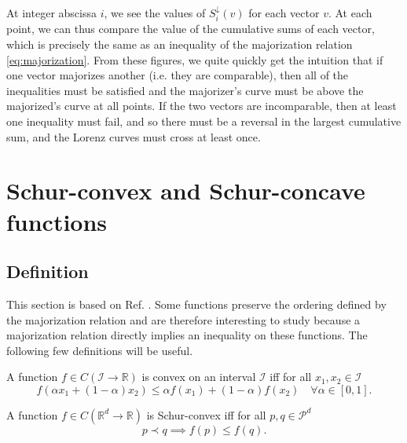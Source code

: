 At integer abscissa $i$, we see the values of $S_i^\downarrow (v)$ for each vector $v$. At each point, we can thus compare the value of the cumulative sums of each vector, which is precisely the same as an inequality of the majorization relation \ref{eq:majorization}. From these figures, we quite quickly get the intuition that if one vector majorizes another (i.e. they are comparable), then all of the inequalities must be satisfied and the majorizer's curve must be above the majorized's curve at all points. If the two vectors are incomparable, then at least one inequality must fail, and so there must be a reversal in the largest cumulative sum, and the Lorenz curves must cross at least once.



\section{Schur-convex and Schur-concave functions}

\subsection{Definition}

This section is based on Ref. \cite[pp. 79-92]{marshall_inequalities_2011}. Some functions preserve the ordering defined by the majorization relation and are therefore interesting to study because a majorization relation directly implies an inequality on these functions. The following few definitions will be useful.

\begin{definition}
    A function $f \in C(\mathcal{I} \to \mathbb{R})$ is convex on an interval $\mathcal{I}$ iff for all $x_1, x_2 \in \mathcal{I}$
    \begin{equation}
        f(\alpha x_1 + (1-\alpha) x_2) \leq \alpha f(x_1) + (1-\alpha) f(x_2) \quad \forall \alpha \in [0, 1].
    \end{equation}
\end{definition}

\begin{definition}
    A function $f \in C(\mathbb{R}^d \to \mathbb{R})$ is Schur-convex iff for all $p, q \in \mathcal{P}^d$
    \begin{equation}
        p \prec q \implies f(p) \leq f(q).
    \end{equation}
\end{definition}

